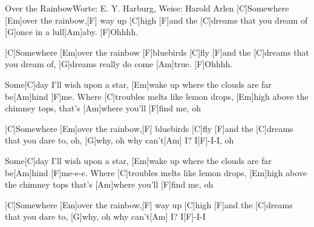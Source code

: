 \documentclass[../main.tex]{subfiles}
\begin{document}
\begin{song}{Over the Rainbow}{Worte: E. Y. Harburg, Weise: Harold Arlen}{}
[C]Somewhere [Em]over the rainbow,[F]  way up [C]high
[F]and the [C]dreams that you dream of [G]once in a lull[Am]aby. [F]Ohhhh.

[C]Somewhere [Em]over the rainbow [F]bluebirds [C]fly
[F]and the [C]dreams that you dream of, [G]dreams really do come [Am]true. [F]Ohhhh.

Some[C]day I'll wish upon a star,
[Em]wake up where the clouds are far be[Am]hind [F]me.
Where [C]troubles melts like lemon drops,
[Em]high above the chimney tops,
that's [Am]where you'll [F]find me, oh

[C]Somewhere [Em]over the rainbow,[F]  bluebirds [C]fly
[F]and the [C]dreams that you dare to, oh, [G]why, oh why can't[Am]{ I?} I[F]-I-I, oh

Some[C]day I'll wish upon a star,
[Em]wake up where the clouds are far be[Am]hind [F]me-e-e.
Where [C]troubles melts like lemon drops,
[Em]high above the chimney tops
that's [Am]where you'll [F]find me, oh

[C]Somewhere [Em]over the rainbow,[F]  way up [C]high
[F]and the [C]dreams that you dare to, [G]why, oh why can't[Am]{ I?} I[F]-I-I
\end{song}
\end{document}
